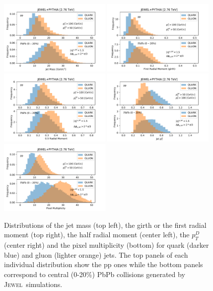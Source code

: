 \documentclass[notoc,preprintnumbers]{JHEP3}
\newcommand{\jw}{\textsc{Jewel}~}
\begin{document}
\begin{figure}[h]
	   \centering
	   \includegraphics[width=0.48\textwidth]{plots/JEWEL_pp_pbpb020_jetMass}
	   \includegraphics[width=0.48\textwidth]{plots/JEWEL_pp_pbpb020_firstRadialMoment}
	   \includegraphics[width=0.48\textwidth]{plots/JEWEL_pp_pbpb020_halfRadialMoment}
	   \includegraphics[width=0.48\textwidth]{plots/JEWEL_pp_pbpb020_pTD}
	   \includegraphics[width=0.48\textwidth]{plots/JEWEL_pp_pbpb020_NumberjetConstituents}
	   \caption{Distributions of the jet mass (top left), the girth or the first radial moment (top right), the half radial moment (center left), the $p^{D}_{T}$ (center right) and the pixel multiplicity (bottom) for quark (darker blue) and gluon (lighter orange) jets. The top panels of each individual distribution show the pp ones while the bottom panels correspond to central (0-20\%) PbPb collisions generated by \jw simulations.}
	   \label{fig:jetdistributons_pp_pbpb}
	\end{figure}
\end{document}
